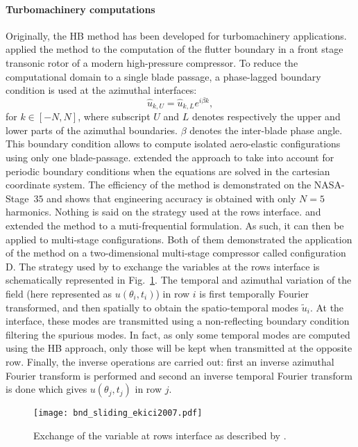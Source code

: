 \paragraph{Turbomachinery computations}
Originally, the HB method has been developed for 
turbomachinery applications.
\citet{Hall2002} applied the method to the computation
of the flutter boundary in a front stage transonic rotor 
of a modern high-pressure compressor. To reduce the
computational domain to a single blade passage, 
a phase-lagged boundary condition is used at the azimuthal
interfaces:
\begin{equation}
	\widehat{u}_{k, U} = \widehat{u}_{k, L} e^{i \beta k},
\end{equation}
for $k \in [-N, N]$, where subscript $U$ and $L$ denotes
respectively the upper and lower parts of the azimuthal boundaries.
$\beta$ denotes the inter-blade phase angle. This boundary
condition allows to compute isolated aero-elastic configurations
using only one blade-passage.
 extended the approach to take into account
for periodic boundary conditions when the equations are solved in the
cartesian coordinate system. The efficiency of the
method is demonstrated on the NASA-Stage~$35$ and shows that
engineering accuracy is obtained with only $N=5$ harmonics.
Nothing is said on the strategy used at the rows interface.
\citet{Ekici2007} and \citet{Gopinath2007}
extended the method to a muti-frequential formulation. 
As such, it can then be applied to multi-stage
configurations. Both of them demonstrated the application of
the method on
a two-dimensional multi-stage compressor called
configuration D. 
The strategy used by \citet{Ekici2007} 
to exchange the variables at
the rows interface is schematically represented 
in Fig.~\ref{fig:bnd_sliding_ekici2007}.
The temporal and azimuthal variation 
of the field (here represented as $u (\theta_i, t_i)$)
in row $i$ is first temporally Fourier transformed, and then
spatially to obtain the spatio-temporal modes $\widetilde{u}_i$.
At the interface, these modes are transmitted using a non-reflecting
boundary condition filtering the spurious modes. In fact, as only some
temporal modes are computed using the HB approach, only
those will be kept when transmitted at the opposite row.
Finally, the inverse operations are carried out: first an inverse
azimuthal Fourier transform is performed and second an inverse
temporal Fourier transform is done which gives $u (\theta_j, t_j)$
in row $j$.
\begin{figure}[htbp]
  \centering
  \texttt{[image: bnd\_sliding\_ekici2007.pdf]}
  \caption{Exchange of the variable at rows interface as described by \citet{Ekici2007}.}
  \label{fig:bnd_sliding_ekici2007}
\end{figure}

